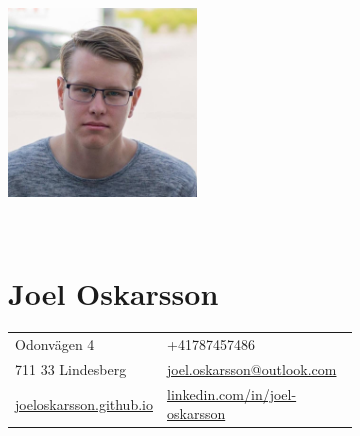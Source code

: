 \documentclass[12pt]{article}
\newcommand{\text}[2]{#2}
\newcommand{\text}[2]{#1}
\begin{document}
\begin{figure}
    \begin{subfigure}[]{0.4\textwidth}
        \includegraphics[height=5cm]{photo}
    \end{subfigure}%
    ~
    \begin{subfigure}[]{0.5\textwidth}
        \part*{Joel Oskarsson}

        \begin{tabular}{l l}
            Odonvägen 4 & +41787457486\\
            711 33 Lindesberg & \href{mailto:joel.oskarsson@outlook.com}{joel.oskarsson@outlook.com}\\

            \href{http://joeloskarsson.github.io}{joeloskarsson.github.io} & \href{http://linkedin.com/in/joel-oskarsson}{linkedin.com/in/joel-oskarsson}
        \end{tabular}

     \end{subfigure}%
\end{figure}
\end{document}
